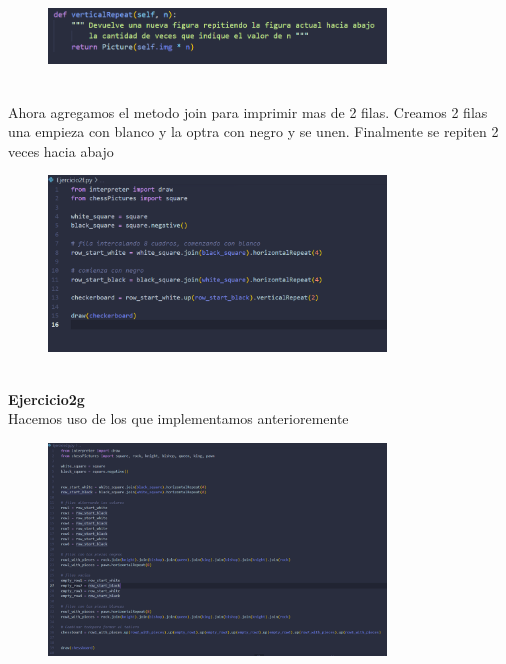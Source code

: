 \documentclass{article}
\begin{document}
    \begin{figure}[H]
		          \centering
		          \includegraphics[width=0.8\textwidth,keepaspectratio]                       {img/picVer.png}
    \end{figure}
    
\\Ahora agregamos el metodo join para imprimir mas de 2 filas. Creamos 2 filas una empieza con blanco y la optra con negro y se unen. Finalmente se repiten 2 veces hacia abajo

    \begin{figure}[H]
		          \centering
		          \includegraphics[width=0.8\textwidth,keepaspectratio]                       {img/Ejef.png}
    \end{figure}

\\
\textbf{Ejercicio2g }
\\Hacemos uso de los que implementamos anterioremente

    \begin{figure}[H]
		          \centering
		          \includegraphics[width=0.8\textwidth,keepaspectratio]                       {img/Ejg.png}
    \end{figure}    
\\
\end{document}
